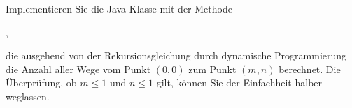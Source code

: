 \documentclass{lehramt-informatik-aufgabe}
\begin{document}
\noindent
Implementieren Sie die Java-Klasse  mit der Methode

\begin{center}
,
\end{center}

\noindent
die ausgehend von der Rekursionsgleichung durch dynamische
Programmierung die Anzahl aller Wege vom Punkt $(0, 0)$ zum Punkt $(m,
n)$ berechnet.
Die Überprüfung, ob $m \leq 1$ und $n \leq 1$ gilt, können Sie der
Einfachheit halber weglassen.

\begin{antwort}
\end{antwort}
\end{document}
